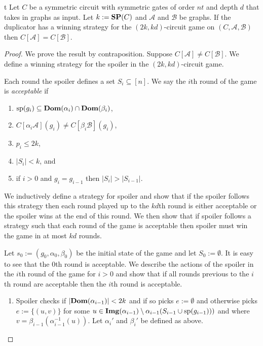 \documentclass[../main/thesis.tex]{subfiles}
\begin{document}
\begin{lem}t 
Let $C$ be a symmetric circuit with symmetric gates of order $nt$ and depth
  $d$ that takes in graphs as input. Let $k := \text{\textbf{SP}}(C)$ and $\mathcal{A}$ and
  $\mathcal{B}$ be graphs. If the duplicator has a winning strategy for the
  $(2k, kd)$-circuit game on $(C, \mathcal{A}, \mathcal{B})$ then $C
  [\mathcal{A}] = C [\mathcal{B}]$.
\end{lem}
\begin{proof}
  We prove the result by contraposition. Suppose $C[\mathcal{A}] \neq C
  [\mathcal{B}]$. We define a winning strategy for the spoiler in the $(2k,
  kd)$-circuit game.

  Each round the spoiler defines a set $S_i \subseteq [n]$. We say the $i$th
  round of the game is \emph{acceptable} if

  \begin{enumerate}
  \item $\text{sp}(g_i) \subseteq \text{\textbf{Dom}}(\alpha_i) \cap \text{\textbf{Dom}} (\beta_i)$,
  \item $C[\alpha_i \mathcal{A}](g_i) \neq C[\beta_i \mathcal{B}](g_i)$,
  \item $p_i \leq 2k$,
  \item $\vert S_i \vert < k$, and
  \item if $ i > 0$ and $g_{i} = g_{i-1}$ then $\vert S_i \vert > \vert S_{i-1}
    \vert$.
  \end{enumerate}

  We inductively define a strategy for spoiler and show that if the spoiler
  follows this strategy then each round played up to the $kd$th round is either
  acceptable or the spoiler wins at the end of this round. We then show that if
  spoiler follows a strategy such that each round of the game is acceptable then
  spoiler must win the game in at most $kd$ rounds.

  Let $s_0 := (g_0, \alpha_0, \beta_0)$ be the initial state of the game and let
  $S_0 := \emptyset$. It is easy to see that the $0$th round is acceptable. We
  describe the actions of the spoiler in the $i$th round of the game for $i > 0$
  and show that if all rounds previous to the $i$th round are acceptable then
  the $i$th round is acceptable.

  \begin{enumerate}
  \item Spoiler checks if $\vert \text{\textbf{Dom}}(\alpha_{i-1}) \vert < 2k$ and if so picks
    $e := \emptyset$ and otherwise picks $e := \{(u,v)\}$ for some $u \in
    \text{\textbf{Img}}(\alpha_{i-1}) \setminus \alpha_{i-1} (S_{i-1} \cup \text{sp}(g_{i-1})))$
    and where $v = \beta_{i-1}(\alpha^{-1}_{i-1}(u))$. Let $\alpha_i'$ and
    $\beta_i'$ be defined as above.


\end{enumerate}
\end{proof}
\end{document}
